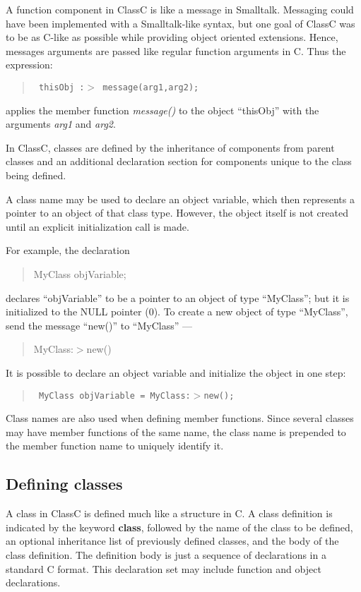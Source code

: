 A function component in ClassC is like a message in Smalltalk.
Messaging could have been implemented with a Smalltalk-like syntax, but
one goal of ClassC was to be as C-like as possible while providing object
oriented extensions.  Hence, messages arguments are passed like regular
function arguments in C.  Thus the expression:
\begin{quote} \tt
thisObj :$>$ message(arg1,arg2);
\end{quote}
applies the member function {\em message()} to the object ``thisObj''
with the arguments {\em arg1} and {\em arg2}.

In ClassC, classes are defined by the inheritance of components from
parent classes and an additional declaration section for components unique
to the class being defined.

A class name may be used to declare an object variable, which then represents
a pointer to an object of that class type.  However, the object itself is not
created until an explicit initialization call is made.

For example, the declaration
\begin{quote}
MyClass objVariable;
\end{quote}
declares ``objVariable'' to be a pointer to an object of type ``MyClass''; but
it is initialized to the NULL pointer (0).  To create a new object of type
``MyClass'', send the message ``new()'' to ``MyClass'' ---
\begin{quote}
MyClass:$>$new()
\end{quote}

It is possible to  declare an object variable and initialize the object
in one step:
\begin{quote} \tt
MyClass objVariable = MyClass:$>$new();
\end{quote}

Class names are also used when defining member functions.
Since several
classes may have member functions of the same name, the class name is
prepended to the member function name to uniquely identify it.

\subsection{Defining classes}
A class in ClassC is defined much like a structure in C.  A class definition
is indicated by the keyword {\bf class}, followed by the name of the class to
be defined, an optional inheritance list of previously defined classes, and
the body of the class definition.  The definition body is just a sequence of
declarations in a standard C format.  This declaration set may include
function and object declarations.

